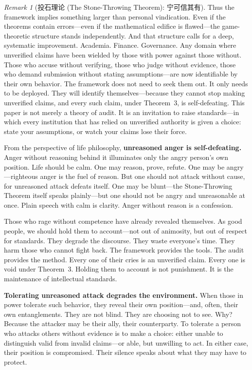 \documentclass[12pt,a4paper]{ctexart}
\theoremstyle{definition}
\theoremstyle{remark}
\newtheorem{remark}{Remark}[section]
\begin{document}
\begin{remark}[投石理论 (The Stone-Throwing Theorem): 宁可信其有]
Thus the framework implies something larger than personal vindication. Even if the theorems contain errors—even if the mathematical edifice is flawed—the game-theoretic structure stands independently. And that structure calls for a deep, systematic improvement. Academia. Finance. Governance. Any domain where unverified claims have been wielded by those with power against those without. Those who accuse without verifying, those who judge without evidence, those who demand submission without stating assumptions—are now identifiable by their own behavior. The framework does not need to seek them out. It only needs to be deployed. They will identify themselves—because they cannot stop making unverified claims, and every such claim, under Theorem~3, is self-defeating. This paper is not merely a theory of audit. It is an invitation to raise standards—in which every institution that has relied on unverified authority is given a choice: state your assumptions, or watch your claims lose their force.

From the perspective of life philosophy, \textbf{unreasoned anger is self-defeating.} Anger without reasoning behind it illuminates only the angry person's own position. Life should be calm. One may reason, prove, refute. One may be angry—righteous anger is the fuel of reason. But one should not attack without cause, for unreasoned attack defeats itself. One may be blunt—the Stone-Throwing Theorem itself speaks plainly—but one should not be angry and unreasonable at once. Plain speech with calm is clarity. Anger without reason is a confession.

Those who rage without competence have already revealed themselves. As good people, we should hold them to account—not out of animosity, but out of respect for standards. They degrade the discourse. They waste everyone's time. They harm those who cannot fight back. The framework provides the tools. The audit provides the method. Every one of their cries is an unverified claim. Every one is void under Theorem~3. Holding them to account is not punishment. It is the maintenance of intellectual standards.

\textbf{Tolerating unreasoned attack degrades the environment.} When those in power tolerate such behavior, they reveal their own position—and, often, their own entanglements. They are not blind. They are choosing not to see. Why? Because the attacker may be their ally, their counterparty. To tolerate a person who attacks others without evidence is to make a choice: either unable to distinguish valid from invalid claims—or able, but unwilling to act. In either case, their position is compromised. Their silence speaks about what they may have to protect.


\end{remark}
\end{document}

